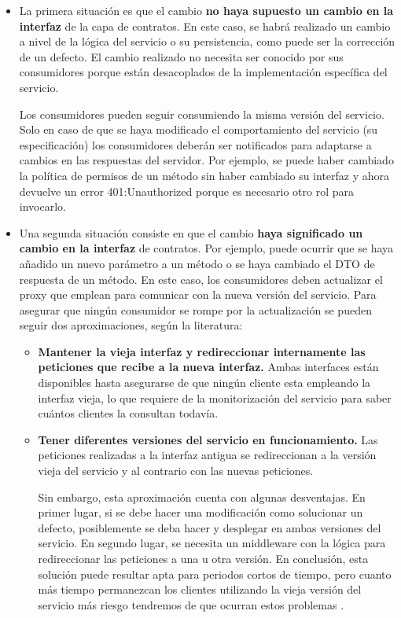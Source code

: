 \documentclass[11pt,spanish,listoffigures]{tfgetsinf}
\begin{document}
\begin{itemize}

\item  La primera situación es que el cambio \textbf{no haya supuesto un cambio en la interfaz} de la capa de contratos. En este caso, se habrá realizado un cambio a nivel de la lógica del servicio o su persistencia, como puede ser la corrección de un defecto. El cambio realizado no necesita ser conocido por sus consumidores porque están desacoplados de la implementación específica del servicio. 

Los consumidores pueden seguir consumiendo la misma versión del servicio. Solo en caso de que se haya modificado el comportamiento del servicio (su especificación) los consumidores deberán ser notificados para adaptarse a cambios en las respuestas del servidor. Por ejemplo, se puede haber cambiado la política de permisos de un método sin haber cambiado su interfaz y ahora devuelve un error 401:Unauthorized porque es necesario otro rol para invocarlo.

\item Una segunda situación consiste en que el cambio \textbf{haya significado un cambio en la interfaz} de contratos. Por ejemplo, puede ocurrir que se haya añadido un nuevo parámetro a un método o se haya cambiado el DTO de respuesta de un método. En este caso, los consumidores deben actualizar el proxy que emplean para comunicar con la nueva versión del servicio. Para asegurar que ningún consumidor se rompe por la actualización se pueden seguir dos aproximaciones, según la literatura:

\begin{itemize}

\item \textbf{Mantener la vieja interfaz y redireccionar internamente las peticiones que recibe a la nueva interfaz.} Ambas interfaces están disponibles hasta asegurarse de que ningún cliente esta empleando la interfaz vieja, lo que requiere de la monitorización del servicio para saber cuántos clientes la consultan todavía.

\item \textbf{Tener diferentes versiones del servicio en funcionamiento.} Las peticiones realizadas a la interfaz antigua se redireccionan a la versión vieja del servicio y al contrario con las nuevas peticiones.

Sin embargo, esta aproximación cuenta con algunas desventajas. En primer lugar, si se debe hacer una modificación como solucionar un defecto, posiblemente se deba hacer y desplegar en ambas versiones del servicio. En segundo lugar, se necesita un middleware con la lógica para redireccionar las peticiones a una u otra versión. En conclusión, esta solución puede resultar apta para periodos cortos de tiempo, pero cuanto más tiempo permanezcan los clientes utilizando la vieja versión del servicio más riesgo tendremos de que ocurran estos problemas \cite{Newman2015a}.

\end{itemize}

\end{itemize}
\end{document}

